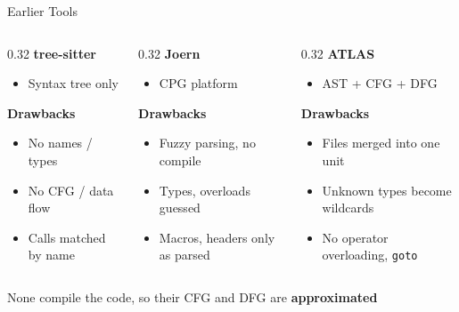 \documentclass[aspectratio=169,10pt]{beamer}
\newcommand{\code}[1]{\texttt{#1}}
\begin{document}
\begin{frame}{Earlier Tools}
  \begin{columns}[T]
    \begin{column}{0.32\textwidth}
      \textbf{tree-sitter}
      \begin{itemize}
        \item Syntax tree only
      \end{itemize}
      \textcolor{badred}{\textbf{Drawbacks}}
      \begin{itemize}
        \item No names / types
        \item No CFG / data flow
        \item Calls matched by name
      \end{itemize}
    \end{column}
    \begin{column}{0.32\textwidth}
      \textbf{Joern}
      \begin{itemize}
        \item CPG platform
      \end{itemize}
      \textcolor{badred}{\textbf{Drawbacks}}
      \begin{itemize}
        \item Fuzzy parsing, no compile
        \item Types, overloads guessed
        \item Macros, headers only as parsed
      \end{itemize}
    \end{column}
    \begin{column}{0.32\textwidth}
      \textbf{ATLAS}
      \begin{itemize}
        \item AST + CFG + DFG
      \end{itemize}
      \textcolor{badred}{\textbf{Drawbacks}}
      \begin{itemize}
        \item Files merged into one unit
        \item Unknown types become wildcards
        \item No operator overloading, \code{goto}
      \end{itemize}
    \end{column}
  \end{columns}

  \vspace{1.2em}
  \begin{exampleblock}{}
    \centering
    None compile the code, so their CFG and DFG are \textbf{approximated}
  \end{exampleblock}
\end{frame}
\end{document}
